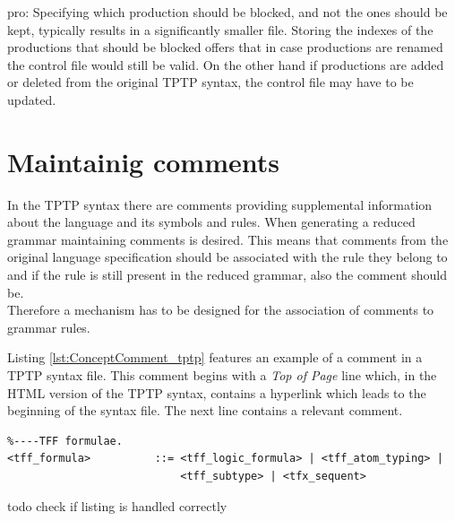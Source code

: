 pro: Specifying which production should be blocked, and not the ones should be kept, typically results in a significantly smaller file.
Storing the indexes of the productions that should be blocked offers that in case productions are renamed the control file would still be valid. On the other hand if productions are added or deleted from the original \ac{TPTP} syntax, the control file may have to be updated.

\section{Maintainig comments}\label{sec:ConceptMaintainingComments}
In the \ac{TPTP} syntax there are comments providing supplemental information about the language and its symbols and rules.
When generating a reduced grammar maintaining comments is desired. This means that comments from the original language specification should be associated with the rule they belong to and if the rule is still present in the reduced grammar, also the comment should be.\\
Therefore a mechanism has to be designed for the association of comments to grammar rules.

Listing \ref{lst:ConceptComment_tptp} features an example of a comment in a \ac{TPTP} syntax file. This comment begins with a \textit{Top of Page} line which, in the HTML version of the \ac{TPTP} syntax, contains a hyperlink which leads to the beginning of the syntax file.
The next line contains a relevant comment.\\
\begin{lstlisting}[language=none, basicstyle=\scriptsize	,caption= Comment in the \ac{TPTP} syntax,label= lst:ConceptComment_tptp]
%----Top of Page---------------------------------------------------------------
%----TFF formulae.
<tff_formula>          ::= <tff_logic_formula> | <tff_atom_typing> |
                           <tff_subtype> | <tfx_sequent>
\end{lstlisting}
todo check if listing is handled correctly

